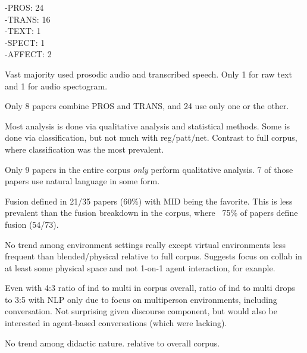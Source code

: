 \documentclass[manuscript,screen,review]{acmart}
\begin{document}
-PROS: 24\\
-TRANS: 16\\
-TEXT: 1\\
-SPECT: 1\\
-AFFECT: 2

Vast majority used prosodic audio and transcribed speech. Only 1 for raw text and 1 for audio spectogram.

Only 8 papers combine PROS and TRANS, and 24 use only one or the other. 

Most analysis is done via qualitative analysis and statistical methods. Some is done via classification, but not much with reg/patt/net. Contrast to full corpus, where classification was the most prevalent.


Only 9 papers in the entire corpus \textit{only} perform qualitative analysis. 7 of those papers use natural language in some form.

Fusion defined in 21/35 papers (60\%) with MID being the favorite. This is less prevalent than the fusion breakdown in the corpus, where ~75\% of papers define fusion (54/73). 


No trend among environment settings really except virtual environments less frequent than blended/physical relative to full corpus. Suggests focus on collab in at least some physical space and not 1-on-1 agent interaction, for exanple.

Even with 4:3 ratio of ind to multi in corpus overall, ratio of ind to multi drops to 3:5 with NLP only due to focus on multiperson environments, including conversation. Not surprising given discourse component, but would also be interested in agent-based conversations (which were lacking). 

No trend among didactic nature. relative to overall corpus.
\end{document}

